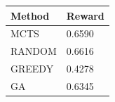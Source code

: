 \begin{tabular}{ll}
\hline
Method & Reward \\
\hline
  MCTS & 0.6590 \\
  RANDOM & 0.6616 \\
  GREEDY & 0.4278 \\
  GA & 0.6345 \\
\hline
\end{tabular}
